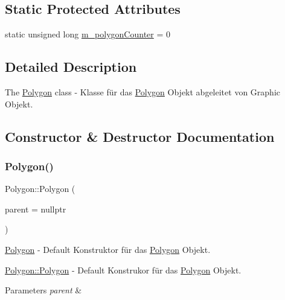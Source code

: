 \subsection*{Static Protected Attributes}
\begin{DoxyCompactItemize}
\item 
static unsigned long \hyperlink{class_polygon_a20f77e208065a18ac17b5b0cd5bd0dce}{m\+\_\+polygon\+Counter} = 0
\end{DoxyCompactItemize}


\subsection{Detailed Description}
The \hyperlink{class_polygon}{Polygon} class -\/ Klasse für das \hyperlink{class_polygon}{Polygon} Objekt abgeleitet von Graphic Objekt. 

\subsection{Constructor \& Destructor Documentation}
\mbox{\label{class_polygon_acca8d3957dfbd44bb27c4519d2bfeb83}} 
\subsubsection{\texorpdfstring{Polygon()}{Polygon()}\hspace{0.1cm}{\footnotesize\ttfamily [1/2]}}
{\footnotesize\ttfamily Polygon\+::\+Polygon (\begin{DoxyParamCaption}\item[{Q\+Object $\ast$}]{parent = {\ttfamily nullptr} }\end{DoxyParamCaption})}



\hyperlink{class_polygon}{Polygon} -\/ Default Konstruktor für das \hyperlink{class_polygon}{Polygon} Objekt. 

\hyperlink{class_polygon_acca8d3957dfbd44bb27c4519d2bfeb83}{Polygon\+::\+Polygon} -\/ Default Konstrukor für das \hyperlink{class_polygon}{Polygon} Objekt.


\begin{DoxyParams}{Parameters}
{\em parent} & \\
\hline
\end{DoxyParams}
\mbox{\label{class_polygon_ace39c67107966db12e13a183f496c3b0}} 
